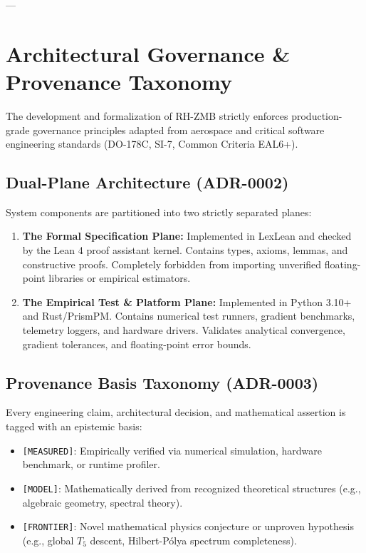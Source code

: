 \documentclass[11pt,a4paper]{article}
\theoremstyle{definition}
\theoremstyle{remark}
\begin{document}
---

\section{Architectural Governance \& Provenance Taxonomy}

The development and formalization of RH-ZMB strictly enforces production-grade governance principles adapted from aerospace and critical software engineering standards (DO-178C, SI-7, Common Criteria EAL6+).

\subsection{Dual-Plane Architecture (ADR-0002)}
System components are partitioned into two strictly separated planes:
\begin{enumerate}
    \item \textbf{The Formal Specification Plane:} Implemented in LexLean and checked by the Lean 4 proof assistant kernel. Contains types, axioms, lemmas, and constructive proofs. Completely forbidden from importing unverified floating-point libraries or empirical estimators.
    \item \textbf{The Empirical Test \& Platform Plane:} Implemented in Python 3.10+ and Rust/PrismPM. Contains numerical test runners, gradient benchmarks, telemetry loggers, and hardware drivers. Validates analytical convergence, gradient tolerances, and floating-point error bounds.
\end{enumerate}

\subsection{Provenance Basis Taxonomy (ADR-0003)}
Every engineering claim, architectural decision, and mathematical assertion is tagged with an epistemic basis:
\begin{itemize}
    \item \texttt{[MEASURED]}: Empirically verified via numerical simulation, hardware benchmark, or runtime profiler.
    \item \texttt{[MODEL]}: Mathematically derived from recognized theoretical structures (e.g., algebraic geometry, spectral theory).
    \item \texttt{[FRONTIER]}: Novel mathematical physics conjecture or unproven hypothesis (e.g., global $T_5$ descent, Hilbert-P\'olya spectrum completeness).
\end{itemize}
\end{document}
